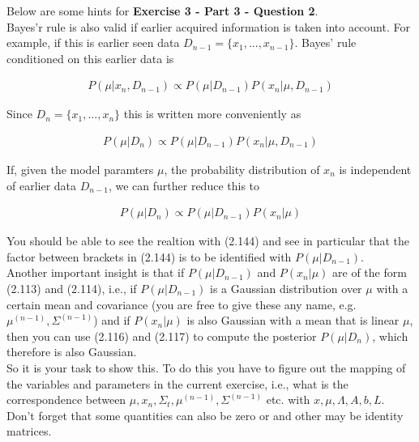 \documentclass[a4paper]{article}
\begin{document}
Below are some hints for \textbf{Exercise 3 - Part 3 - Question 2}.\\

Bayes'r rule is also valid if earlier acquired information is taken into account. For example, if this is earlier seen data $D_{n - 1} = \{ x_1,..., x_{n - 1}\}$. Bayes' rule conditioned on this earlier data is 

\begin{align*}
	P(\mu | x_n, D_{n - 1}) \propto P(\mu | D_{n - 1}) P(x_n | \mu, D_{n - 1})
\end{align*}

Since $D_n = \{ x_1, ..., x_n\}$ this is written more conveniently as 

\begin{align*}
	P(\mu | D_{n}) \propto P(\mu | D_{n - 1}) P(x_n | \mu, D_{n - 1})
\end{align*}


If, given the model paramters $\mu$, the probability distribution of $x_n$ is independent of earlier data $D_{n - 1}$, we can further reduce this to

\begin{align*}
	P(\mu | D_{n}) \propto P(\mu | D_{n - 1}) P(x_n | \mu)
\end{align*}

You should be able to see the realtion with (2.144) and see in particular that the factor between brackets in (2.144) is to be identified with $P(\mu | D_{n - 1})$.\\
Another important insight is that if $P(\mu | D_{n - 1})$ and $P(x_n | \mu)$ are of the form (2.113) and (2.114), i.e., if $P(\mu | D_{n - 1})$ is a Gaussian distribution over $\mu$ with a certain mean and covariance (you are free to give these any name, e.g. $\mu^{(n-1)}, \Sigma^{(n-1)}$) and if $P(x_n | \mu)$ is also Gaussian with a mean that is linear $\mu$, then you can use (2.116) and (2.117) to compute the posterior $P(\mu | D_n)$, which therefore is also Gaussian.\\
So it is your task to show this. To do this you have to figure out the mapping of the variables and parameters in the current exercise, i.e., what is the correspondence between $\mu, x_n, \Sigma_t, \mu^{(n-1)}, \Sigma^{(n-1)}$ etc. with $x, \mu, \Lambda, A, b, L$. Don't forget that some quantities can also be zero or and other may be identity matrices.
\end{document}

